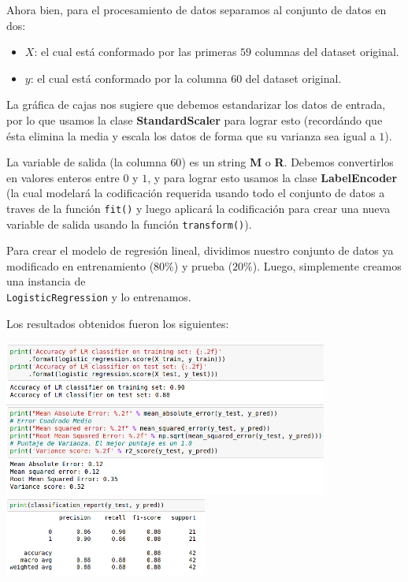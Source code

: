 \documentclass[letterpaper,11pt]{article}
\begin{document}
\begin{enumerate}
    Ahora bien, para el procesamiento de datos separamos al conjunto de datos 
    en dos:
    \begin{itemize}
        \item $X$: el cual está conformado por las primeras $59$ columnas del 
        dataset original.
        \item $y$: el cual está conformado por la columna $60$ del dataset 
        original.
    \end{itemize}

    La gráfica de cajas nos sugiere que debemos estandarizar los datos de 
    entrada, por lo que usamos la clase \textbf{StandardScaler} para lograr 
    esto (recordándo que ésta elimina la media y escala los datos de forma que 
    su varianza sea igual a $1$). 

    La variable de salida (la columna $60$) es un string \textbf{M} o \textbf{R}.
    Debemos convertirlos en valores enteros entre $0$ y $1$, y para lograr esto 
    usamos la clase \textbf{LabelEncoder} (la cual modelará la codificación 
    requerida usando todo el conjunto de datos a traves de la función 
    \texttt{fit()} y luego aplicará la codificación para crear una nueva variable 
    de salida usando la función \texttt{transform()}).

    Para crear el modelo de regresión lineal, dividimos nuestro conjunto de datos 
    ya modificado en entrenamiento ($80\%$) y prueba ($20\%$). Luego, simplemente 
    creamos una instancia de \\ 
    \texttt{LogisticRegression}  y lo entrenamos.

    Los resultados obtenidos fueron los siguientes:
    \begin{center}
        \includegraphics[width=0.8\textwidth]{imagenes/sonar-lg1.png}
        \includegraphics[width=0.5\textwidth]{imagenes/sonar-lg2.png}
    \end{center}


\end{enumerate}
\end{document}
